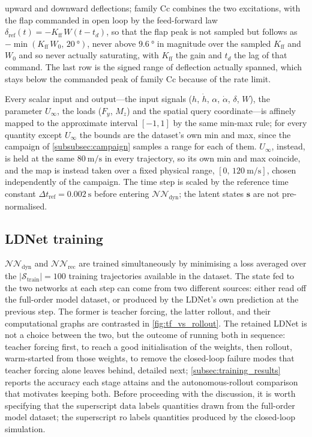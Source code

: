 \begin{table}[t]
{    upward and downward deflections; family Cc combines the two excitations, with the flap
    commanded in open loop by the feed-forward law $\delta_{\mathrm{ref}}(t) = -K_{\mathrm{ff}}\,
    W(t-t_d)$, so that the flap peak is not sampled but follows as
    $-\min(K_{\mathrm{ff}}\,W_0,\,\SI{20}{\degree})$, never above $\SI{9.6}{\degree}$ in magnitude
    over the sampled $K_{\mathrm{ff}}$ and $W_0$ and so never actually saturating, with
    $K_{\mathrm{ff}}$ the gain and $t_d$ the lag of
    that command. The last row is the signed range of deflection actually spanned, which stays
    below the commanded peak of family Cc because of the rate limit.}
    \label{tab:dataset_families}
\end{table}

Every scalar input and output---the input signals ($h$, $\dot{h}$, $\alpha$, $\dot{\alpha}$, $\delta$, $W$), the parameter $U_\infty$, the loads ($F_y$, $M_z$) and the spatial query coordinate---is affinely mapped to the approximate interval $[-1,1]$ by the same min-max rule; for every quantity except $U_\infty$ the bounds are the dataset's own min and max, since the campaign of \cref{subsubsec:campaign} samples a range for each of them. $U_\infty$, instead, is held at the same $\SI{80}{\meter\per\second}$ in every trajectory, so its own min and max coincide, and the map is instead taken over a fixed physical range, $[0,\,\SI{120}{\meter\per\second}]$, chosen independently of the campaign. The time step is scaled by the reference time constant $\Delta t_{\mathrm{ref}} = \SI{0.002}{\second}$ before entering $\mathcal{NN}_\mathrm{dyn}$; the latent states $\mathbf{s}$ are not pre-normalised.

\subsection{LDNet training}
\label{subsec:training}

$\mathcal{NN}_{\mathrm{dyn}}$ and $\mathcal{NN}_{\mathrm{rec}}$ are trained
simultaneously by minimising a loss averaged over the
$|\mathcal{S}_{\mathrm{train}}| = 100$ training trajectories available in
the dataset. The state fed to the two networks at each step can come from
two different sources: either read off the full-order model dataset, or
produced by the LDNet's own prediction at the previous step. The former is
teacher forcing, the latter rollout, and their computational graphs are
contrasted in \cref{fig:tf_vs_rollout}. The retained LDNet is not a choice
between the two, but the outcome of running both in sequence: teacher
forcing first, to reach a good initialisation of the weights, then rollout,
warm-started from those weights, to remove the closed-loop failure modes
that teacher forcing alone leaves behind, detailed next;
\cref{subsec:training_results} reports the accuracy each stage attains and
the autonomous-rollout comparison that motivates keeping both. Before proceeding with the discussion, it is worth specifying that the superscript $\mathrm{data}$ labels quantities drawn
from the full-order model dataset; the superscript $\mathrm{ro}$ labels quantities produced by the
closed-loop simulation.


